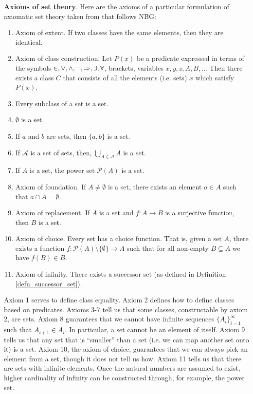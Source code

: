 \documentclass{article}
\newcommand{\marginleft}[1] {\reversemarginpar\marginpar{#1}}
\begin{document}
\textbf{Axioms of set theory}. Here \marginleft{Set theory axioms} are the axioms of a particular formulation of axiomatic set theory taken from \cite{pinter2014book} that follows NBG:
\begin{enumerate}
	\item Axiom of extent. If two classes have the same elements, then they are identical.
	\item Axiom of class construction. Let $P(x)$ be a predicate expressed in terms of the symbols $\in, \vee, \wedge, \neg, \Rightarrow, \exists, \forall$, brackets, variables $x, y, z, A, B, ...$ Then there exists a class $C$ that consists of all the elements (i.e. sets) $x$ which satisfy $P(x)$.
	\item Every subclass of a set is a set.
	\item $\emptyset$ is a set.
	\item If $a$ and $b$ are sets, then $\{a, b\}$ is a set.
	\item If $\mathcal{A}$ is a set of sets, then, $\bigcup\limits_{A \in \mathcal{A}} A$ is a set.
	\item If $A$ is a set, the power set $\mathcal{P}(A)$ is a set.
	\item Axiom of foundation. If $A \neq \emptyset$ is a set, there exists an element $a \in A$ such that $a \cap A = \emptyset$.
	\item Axiom of replacement. If $A$ is a set and $f : A \to B$ is a surjective function, then $B$ is a set.
	\item Axiom of choice. Every set has a choice function. That is, given a set $A$, there exists a function $f : \mathcal{P}(A) \setminus \{ \emptyset \} \to A$ such that for all non-empty $B \subseteq A$ we have $f(B) \in B$.
	\item Axiom of infinity. There exists a successor set (as defined in Definition \ref{defn_successor_set}).
\end{enumerate}


\begin{remark}
	Axiom 1 serves to define class equality. Axiom 2 defines how to define classes based on predicates. Axioms 3-7 tell us that some classes, constructable by axiom 2, are sets. Axiom 8 guarantees that we cannot have infinite sequences $\{ A_i \}_{i=1}^\infty$ such that $A_{i+1} \in A_i$. In particular, a set cannot be an element of itself. Axiom 9 tells us that any set that is ``smaller'' than a set (i.e. we can map another set onto it) is a set. Axiom 10, the axiom of choice, guarantees that we can always pick an element from a set, though it does not tell us how. Axiom 11 tells us that there are sets with infinite elements. Once the natural numbers are assumed to exist, higher cardinality of infinity can be constructed through, for example, the power set.
\end{remark}
\end{document}

